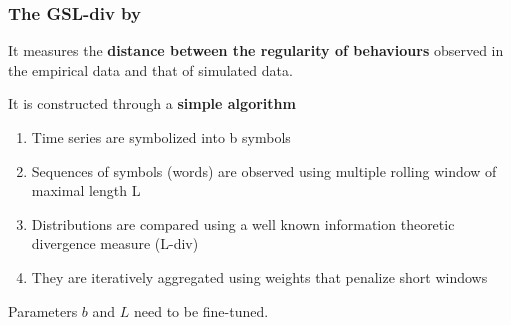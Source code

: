 \documentclass[10pt]{beamer}
\begin{document}
\begin{frame}[c]\frametitle{The GSL-div by \citet{lamperti2018gsl}}

	It measures the \alert{\textbf{distance between the regularity of behaviours}} observed in the empirical data and that of simulated data. \bigskip

	It is constructed through a \alert{\textbf{simple algorithm}}
	\begin{enumerate}
		\item Time series are symbolized into b symbols
		\item Sequences of symbols (words) are observed using multiple rolling window of maximal length L
		\item Distributions are compared using a well known information theoretic divergence measure (L-div)
		\item They are iteratively aggregated using weights that penalize short windows
	\end{enumerate}

	Parameters $b$ and $L$ need to be fine-tuned.
\end{frame}
\end{document}
